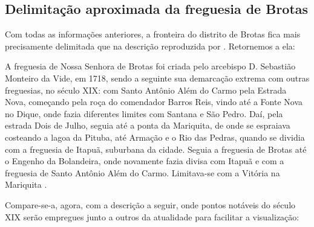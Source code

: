 \subsection{Delimitação aproximada da freguesia de Brotas}

Com todas as informações anteriores, a fronteira do distrito de Brotas fica mais precisamente delimitada que na descrição reproduzida por . Retornemos a ela:

\begin{citacao}
A freguesia de Nossa Senhora de Brotas foi criada pelo arcebispo D. Sebastião Monteiro da Vide, em 1718, sendo a seguinte sua demarcação extrema com outras freguesias, no século XIX: com Santo Antônio Além do Carmo pela Estrada Nova, começando pela roça do comendador Barros Reis, vindo até a Fonte Nova no Dique, onde fazia diferentes limites com Santana e São Pedro. Daí, pela estrada Dois de Julho, seguia até a ponta da Mariquita, de onde se espraiava costeando a lagoa da Pituba, até Armação e o Rio das Pedras, quando se dividia com a freguesia de Itapuã, suburbana da cidade. Seguia a freguesia de Brotas até o Engenho da Bolandeira, onde novamente fazia divisa com Itapuã e com a freguesia de Santo Antônio Além do Carmo. Limitava-se com a Vitória na Mariquita \cite[p.~58]{NASCIMENTO2007}.
\end{citacao}

Compare-se-a, agora, com a descrição a seguir, onde pontos notáveis do século XIX serão empregues junto a outros da atualidade para facilitar a visualização:

